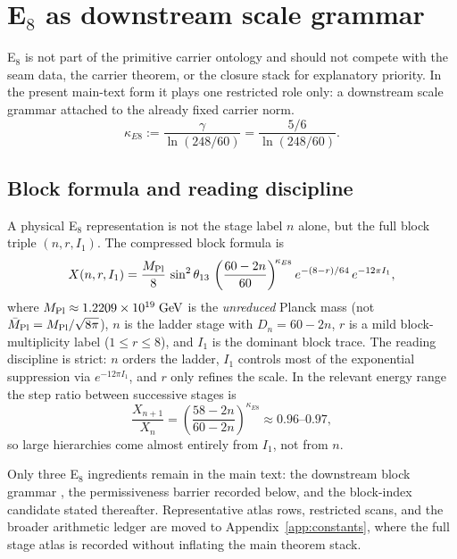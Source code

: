 \section{\texorpdfstring{E$_8$}{E8} as downstream scale grammar}

E$_8$ is not part of the primitive carrier ontology and should not compete with the seam data, the carrier theorem, or the closure stack for explanatory priority. In the present main-text form it plays one restricted role only: a downstream scale grammar attached to the already fixed carrier norm.
\[
\kappa_{E8}:=\frac{\gamma}{\ln(248/60)}=\frac{5/6}{\ln(248/60)}.
\]

\subsection{Block formula and reading discipline}

A physical E$_8$ representation is not the stage label $n$ alone, but the full block triple $(n,r,I_1)$. The compressed block formula is
\begin{equation}
\label{eq:e8-block-formula}
X(n,r,I_1)
=
\frac{M_{\mathrm{Pl}}}{8}\,\sin^2\theta_{13}\,
\left(\frac{60-2n}{60}\right)^{\!\kappa_{E8}}
e^{-(8-r)/64}\,
e^{-12\pi I_1},
\end{equation}
where $M_{\mathrm{Pl}}\approx\num{1.2209e19}\;\mathrm{GeV}$ is the \emph{unreduced} Planck mass (not $\bar M_{\mathrm{Pl}}=M_{\mathrm{Pl}}/\sqrt{8\pi}$), $n$ is the ladder stage with $D_n=60-2n$, $r$ is a mild block-multiplicity label ($1\le r\le 8$), and $I_1$ is the dominant block trace. The reading discipline is strict: $n$ orders the ladder, $I_1$ controls most of the exponential suppression via $e^{-12\pi I_1}$, and $r$ only refines the scale. In the relevant energy range the step ratio between successive stages is
\[
\frac{X_{n+1}}{X_n}=\left(\frac{58-2n}{60-2n}\right)^{\!\kappa_{E8}}\approx 0.96\text{--}0.97,
\]
so large hierarchies come almost entirely from $I_1$, not from $n$.
\begin{remark}
Only three E$_8$ ingredients remain in the main text: the downstream block grammar , the permissiveness barrier recorded below, and the block-index candidate stated thereafter. Representative atlas rows, restricted scans, and the broader arithmetic ledger are moved to Appendix~\ref{app:constants}, where the full stage atlas is recorded without inflating the main theorem stack.
\end{remark}

